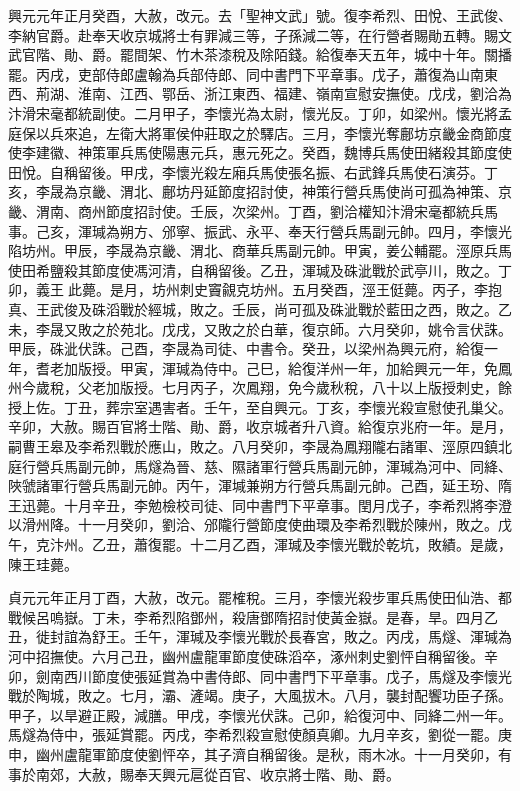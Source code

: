 \begin{pinyinscope}
 興元元年正月癸酉，大赦，改元。去「聖神文武」號。復李希烈、田悅、王武俊、李納官爵。赴奉天收京城將士有罪減三等，子孫減二等，在行營者賜勛五轉。賜文武官階、勛、爵。罷間架、竹木茶漆稅及除陌錢。給復奉天五年，城中十年。關播罷。丙戌，吏部侍郎盧翰為兵部侍郎、同中書門下平章事。戊子，蕭復為山南東西、荊湖、淮南、江西、鄂岳、浙江東西、福建、嶺南宣慰安撫使。戊戌，劉洽為汴滑宋毫都統副使。二月甲子，李懷光為太尉，懷光反。丁卯，如梁州。懷光將孟庭保以兵來追，左衛大將軍侯仲莊取之於驛店。三月，李懷光奪鄜坊京畿金商節度使李建徽、神策軍兵馬使陽惠元兵，惠元死之。癸酉，魏博兵馬使田緒殺其節度使田悅。自稱留後。甲戌，李懷光殺左廂兵馬使張名振、右武鋒兵馬使石演芬。丁亥，李晟為京畿、渭北、鄜坊丹延節度招討使，神策行營兵馬使尚可孤為神策、京畿、渭南、商州節度招討使。壬辰，次梁州。丁酉，劉洽權知汴滑宋毫都統兵馬事。己亥，渾瑊為朔方、邠寧、振武、永平、奉天行營兵馬副元帥。四月，李懷光陷坊州。甲辰，李晟為京畿、渭北、商華兵馬副元帥。甲寅，姜公輔罷。涇原兵馬使田希鹽殺其節度使馮河清，自稱留後。乙丑，渾瑊及硃泚戰於武亭川，敗之。丁卯，義王此薨。是月，坊州刺史竇覦克坊州。五月癸酉，涇王侹薨。丙子，李抱真、王武俊及硃滔戰於經城，敗之。壬辰，尚可孤及硃泚戰於藍田之西，敗之。乙未，李晟又敗之於苑北。戊戌，又敗之於白華，復京師。六月癸卯，姚令言伏誅。甲辰，硃泚伏誅。己酉，李晟為司徒、中書令。癸丑，以梁州為興元府，給復一年，耆老加版授。甲寅，渾瑊為侍中。己巳，給復洋州一年，加給興元一年，免鳳州今歲稅，父老加版授。七月丙子，次鳳翔，免今歲秋稅，八十以上版授刺史，餘授上佐。丁丑，葬宗室遇害者。壬午，至自興元。丁亥，李懷光殺宣慰使孔巢父。辛卯，大赦。賜百官將士階、勛、爵，收京城者升八資。給復京兆府一年。是月，嗣曹王皋及李希烈戰於應山，敗之。八月癸卯，李晟為鳳翔隴右諸軍、涇原四鎮北庭行營兵馬副元帥，馬燧為晉、慈、隰諸軍行營兵馬副元帥，渾瑊為河中、同絳、陜虢諸軍行營兵馬副元帥。丙午，渾堿兼朔方行營兵馬副元帥。己酉，延王玢、隋王迅薨。十月辛丑，李勉檢校司徒、同中書門下平章事。閏月戊子，李希烈將李澄以滑州降。十一月癸卯，劉洽、邠隴行營節度使曲環及李希烈戰於陳州，敗之。戊午，克汴州。乙丑，蕭復罷。十二月乙酉，渾瑊及李懷光戰於乾坑，敗績。是歲，陳王珪薨。



 貞元元年正月丁酉，大赦，改元。罷榷稅。三月，李懷光殺步軍兵馬使田仙浩、都戰候呂嗚嶽。丁未，李希烈陷鄧州，殺唐鄧隋招討使黃金嶽。是春，旱。四月乙丑，徙封誼為舒王。壬午，渾瑊及李懷光戰於長春宮，敗之。丙戌，馬燧、渾瑊為河中招撫使。六月己丑，幽州盧龍軍節度使硃滔卒，涿州刺史劉怦自稱留後。辛卯，劍南西川節度使張延賞為中書侍郎、同中書門下平章事。戊子，馬燧及李懷光戰於陶城，敗之。七月，灞、滻竭。庚子，大風拔木。八月，襲封配饗功臣子孫。甲子，以旱避正殿，減膳。甲戌，李懷光伏誅。己卯，給復河中、同絳二州一年。馬燧為侍中，張延賞罷。丙戌，李希烈殺宣慰使顏真卿。九月辛亥，劉從一罷。庚申，幽州盧龍軍節度使劉怦卒，其子濟自稱留後。是秋，雨木冰。十一月癸卯，有事於南郊，大赦，賜奉天興元扈從百官、收京將士階、勛、爵。




\end{pinyinscope}
